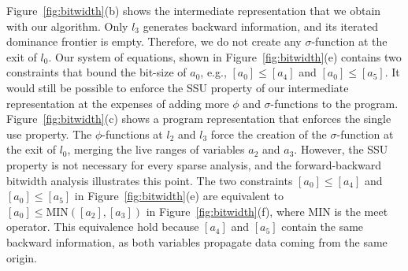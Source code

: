 \documentclass[11pt]{article}
\begin{document}
Figure~\ref{fig:bitwidth}(b) shows the intermediate representation that we obtain with our \SSIfy{} algorithm.
Only $l_3$ generates backward information, and its iterated dominance frontier is empty.
Therefore, we do not create any $\sigma$-function at the exit of $l_0$.
Our system of equations, shown in Figure~\ref{fig:bitwidth}(e) contains two constraints that bound the bit-size of $a_0$, e.g., $[a_0] \leq [a_4]$ and $[a_0] \leq [a_5]$.
It would still be possible to enforce the SSU property of our intermediate representation at the expenses of adding more $\phi$ and $\sigma$-functions to the program.
Figure~\ref{fig:bitwidth}(c) shows a program representation that enforces the single use property.
The $\phi$-functions at $l_2$ and $l_3$ force the creation of the $\sigma$-function at the exit of $l_0$, merging the live ranges of variables $a_2$ and $a_3$.
However, the SSU property is not necessary for every sparse analysis, and the forward-backward bitwidth analysis illustrates this point.
The two constraints $[a_0] \leq [a_4]$ and $[a_0] \leq [a_5]$ in Figure~\ref{fig:bitwidth}(e) are equivalent to $[a_0] \leq \mbox{MIN}([a_2], [a_3])$ in Figure~\ref{fig:bitwidth}(f), where MIN is the meet operator.
This equivalence hold because $[a_4]$ and $[a_5]$ contain the same backward information, as both variables propagate data coming from the same origin.
\end{document}
